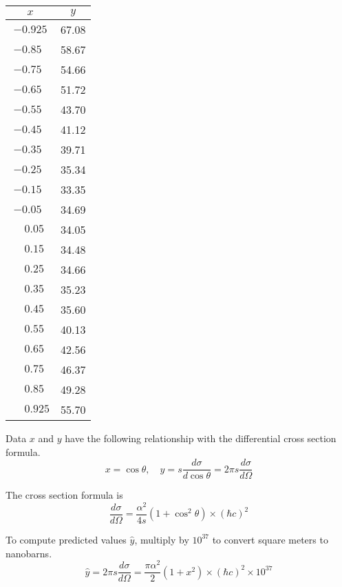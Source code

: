 \documentclass[12pt]{article}
\begin{document}
\begin{center}
\begin{tabular}{|c|c|}
\hline
$x$ & $y$\\
\hline
$-0.925$ & 67.08\\
$-0.85\phantom{0}$ & 58.67\\
$-0.75\phantom{0}$ & 54.66\\
$-0.65\phantom{0}$ & 51.72\\
$-0.55\phantom{0}$ & 43.70\\
$-0.45\phantom{0}$ & 41.12\\
$-0.35\phantom{0}$ & 39.71\\
$-0.25\phantom{0}$ & 35.34\\
$-0.15\phantom{0}$ & 33.35\\
$-0.05\phantom{0}$ & 34.69\\
$\phantom{+}0.05\phantom{0}$ & 34.05\\
$\phantom{+}0.15\phantom{0}$ & 34.48\\
$\phantom{+}0.25\phantom{0}$ & 34.66\\
$\phantom{+}0.35\phantom{0}$ & 35.23\\
$\phantom{+}0.45\phantom{0}$ & 35.60\\
$\phantom{+}0.55\phantom{0}$ & 40.13\\
$\phantom{+}0.65\phantom{0}$ & 42.56\\
$\phantom{+}0.75\phantom{0}$ & 46.37\\
$\phantom{+}0.85\phantom{0}$ & 49.28\\
$\phantom{+}0.925$ & 55.70\\
\hline
\end{tabular}
\end{center}

Data $x$ and $y$ have the following relationship with the differential cross section formula.
\begin{equation*}
x=\cos\theta,
\quad
y=s\frac{d\sigma}{d\cos\theta}=2\pi s\frac{d\sigma}{d\Omega}
\end{equation*}

The cross section formula is
\begin{equation*}
\frac{d\sigma}{d\Omega}=\frac{\alpha^2}{4s}\left(1+\cos^2\theta\right)\times(\hbar c)^2
\end{equation*}

To compute predicted values $\hat{y}$, multiply by $10^{37}$ to convert square meters to nanobarns.
\begin{equation*}
\hat y=2\pi s\frac{d\sigma}{d\Omega}=\frac{\pi\alpha^2}{2}\left(1+x^2\right)\times(\hbar c)^2\times10^{37}
\end{equation*}
\end{document}
